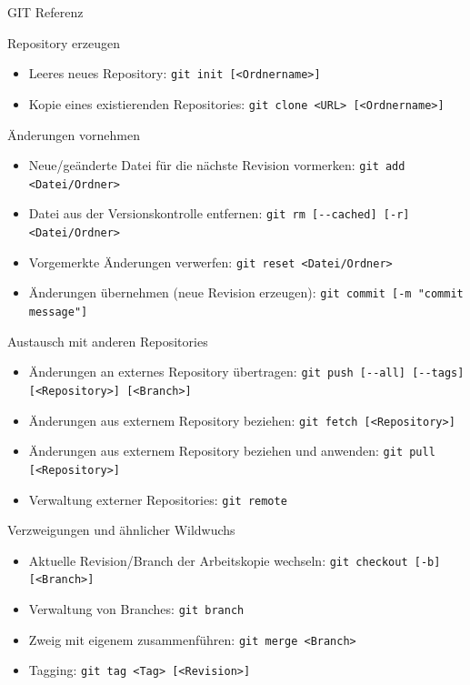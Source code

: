 \documentclass[18pt]{beamer}
\begin{document}
\begin{frame}{GIT Referenz}
	\begin{block}{Repository erzeugen}
		\begin{itemize}
			\item Leeres neues Repository: \verb|git init [<Ordnername>]|
			\item Kopie eines existierenden Repositories: \verb|git clone <URL> [<Ordnername>]|
		\end{itemize}
	\end{block}
	\begin{block}{Änderungen vornehmen}
		\begin{itemize}
			\item Neue/geänderte Datei für die nächste Revision vormerken: \verb|git add <Datei/Ordner>|
			\item Datei aus der Versionskontrolle entfernen: \verb|git rm [--cached] [-r] <Datei/Ordner>|
			\item Vorgemerkte Änderungen verwerfen: \verb|git reset <Datei/Ordner>|
			\item Änderungen übernehmen (neue Revision erzeugen): \verb|git commit [-m "commit message"]|
		\end{itemize}
	\end{block}
	\begin{block}{Austausch mit anderen Repositories}
		\begin{itemize}
			\item Änderungen an externes Repository übertragen: \verb|git push [--all] [--tags] [<Repository>] [<Branch>]|
			\item Änderungen aus externem Repository beziehen: \verb|git fetch [<Repository>]|
			\item Änderungen aus externem Repository beziehen und anwenden: \verb|git pull [<Repository>]|
			\item Verwaltung externer Repositories: \verb|git remote|
		\end{itemize}
	\end{block}
	\begin{block}{Verzweigungen und ähnlicher Wildwuchs}
		\begin{itemize}
			\item Aktuelle Revision/Branch der Arbeitskopie wechseln: \verb|git checkout [-b] [<Branch>]|
			\item Verwaltung von Branches: \verb|git branch|
			\item Zweig mit eigenem zusammenführen: \verb|git merge <Branch>|
			\item Tagging: \verb|git tag <Tag> [<Revision>]|
		\end{itemize}
	\end{block}
\end{frame}
\end{document}
